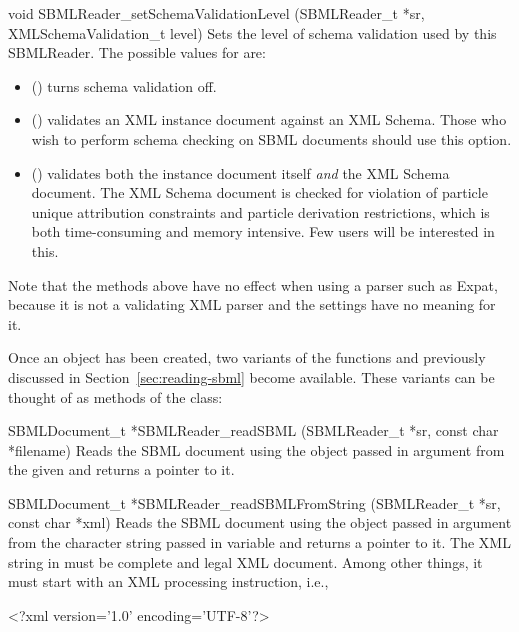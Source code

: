 \documentclass{sbmlmanual}
\begin{document}
\begin{methoddef}{void SBMLReader\_setSchemaValidationLevel (SBMLReader\_t *sr,
XMLSchemaValidation\_t level)}
  Sets the level of schema validation used by this SBMLReader.
  The possible values for  are:
  \begin{itemize}
  \item {} () turns schema
    validation off.
    
  \item {} () validates an XML
    instance document against an XML Schema.  Those who wish to perform
    schema checking on SBML documents should use this option.
    
  \item {} () validates both the
    instance document itself \emph{and} the XML Schema document.  The XML
    Schema document is checked for violation of particle unique attribution
    constraints and particle derivation restrictions, which is both
    time-consuming and memory intensive.  Few users will be interested in
    this. 
  \end{itemize}
\end{methoddef}

Note that the  methods above have no effect when
using a parser such as Expat, because it is not a validating XML parser and
the settings have no meaning for it.

Once an  object has been created, two variants of the
functions  and  previously
discussed in Section~\ref{sec:reading-sbml} become available.  These
variants can be thought of as methods of the  class:


\begin{methoddef}{SBMLDocument\_t *SBMLReader\_readSBML (SBMLReader\_t *sr,
const char *filename)}
Reads the SBML document using the  object passed in
argument  from the given  and returns a
pointer to it.
\end{methoddef}

\begin{methoddef}{SBMLDocument\_t *SBMLReader\_readSBMLFromString (SBMLReader\_t *sr,\\
const char *xml)}
Reads the SBML document using the  object passed in
argument  from the character string passed in variable
 and returns a pointer to it.  The XML string in
 must be complete and legal XML document.  Among other
things, it must start with an XML processing instruction, i.e.,
  \begin{xmlVerbatim}
    <?xml version='1.0' encoding='UTF-8'?>
  \end{xmlVerbatim}
\end{methoddef}
\end{document}
